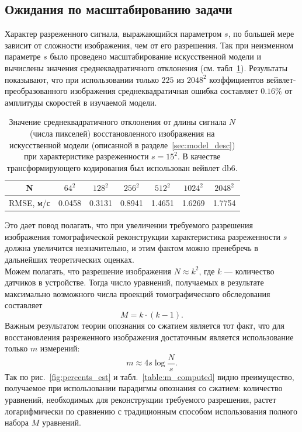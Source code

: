 \documentclass[14pt]{matmex-diploma-custom}
\begin{document}
\subsection{Ожидания по масштабированию задачи}

Характер разреженного сигнала, выражающийся параметром $s$, по большей мере зависит от сложности изображения, чем от его разрешения. Так при неизменном параметре $s$ было проведено масштабирование искусственной модели и вычислены значения среднеквадратичного отклонения (см. табл~\ref{table:problem_scaling}). Результаты показывают, что при использовании только $225$ из $2048^2$ коэффициентов вейвлет-преобразованного изображения среднеквадратичная ошибка составляет $0.16\%$ от амплитуды скоростей в изучаемой модели.

\begin{table}[h]
\centering
\begin{tabular}{ c | c | c | c | c | c | c }
    \hline
    N & $64^2$ & $128^2$ & $256^2$ & $512^2$ & $1024^2$ & $2048^2$ \\
    \hline
    RMSE, м/с & 0.0458 & 0.3131 & 0.8941 & 1.4651 & 1.6269 & 1.7754 \\
    \hline
\end{tabular}
\caption{\small Значение среднеквадратичного отклонения от длины сигнала $N$ (числа пикселей) восстановленного изображения на искусственной модели (описанной в разделе~\ref{sec:model_desc}) при характеристике разреженности $s = 15^2$. В качестве трансформирующего кодирования был использован вейвлет db6.}
\label{table:problem_scaling}
\end{table}

Это дает повод полагать, что при увеличении требуемого разрешения изображения томографической реконструкции характеристика разреженности $s$ должна увеличится незначительно, и этим фактом можно пренебречь в дальнейших теоретических оценках.\\

Можем полагать, что разрешение изображения $N \approx k^2$, где $k$ --- количество датчиков в устройстве. Тогда число уравнений, получаемых в результате максимально возможного числа проекций томографического обследования составляет \[M = k\cdot (k-1).\] Важным результатом теории опознания со сжатием является тот факт, что для восстановления разреженного изображения достаточным является использование только $m$ измерений:
\begin{equation}\label{eq:approx_m}
m \approx 4 s  \log{\frac{N}{s}}.
\end{equation}
Так по рис.~\ref{fig:percents_est} и табл.~\ref{table:m_computed} видно преимущество, получаемое при использовании парадигмы опознания со сжатием: количество уравнений, необходимых для реконструкции требуемого разрешения, растет логарифмически по сравнению с традиционным способом использования полного набора $M$ уравнений.
\end{document}
